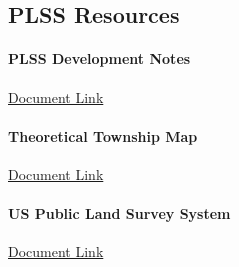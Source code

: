 
\subsection{PLSS Resources}
\paragraph{PLSS Development Notes}
\href{../../documentation/readingRoom/geography101/PLSSNotes.pdf}{Document Link}
\paragraph{Theoretical Township Map}
\href{../../documentation/readingRoom/geography101/TheoreticalTownshipMap.pdf}{Document Link}
\paragraph{US Public Land Survey System}
\href{../../documentation/readingRoom/geography101/CalTransPLSS.pdf}{Document Link}

